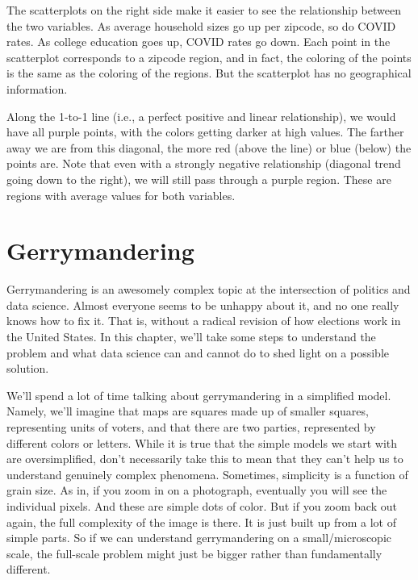 \documentclass[
  openany]{book}
\begin{document}
The scatterplots on the right side make it easier to see the relationship between the two variables. As average household sizes go up per zipcode, so do COVID rates. As college education goes up, COVID rates go down. Each point in the scatterplot corresponds to a zipcode region, and in fact, the coloring of the points is the same as the coloring of the regions. But the scatterplot has no geographical information.

Along the 1-to-1 line (i.e., a perfect positive and linear relationship), we would have all purple points, with the colors getting darker at high values. The farther away we are from this diagonal, the more red (above the line) or blue (below) the points are. Note that even with a strongly negative relationship (diagonal trend going down to the right), we will still pass through a purple region. These are regions with average values for both variables.

\hypertarget{gerrymandering}{%
\chapter{Gerrymandering}\label{gerrymandering}}

Gerrymandering is an awesomely complex topic at the intersection of politics and data science. Almost everyone seems to be unhappy about it, and no one really knows how to fix it. That is, without a radical revision of how elections work in the United States. In this chapter, we'll take some steps to understand the problem and what data science can and cannot do to shed light on a possible solution.

We'll spend a lot of time talking about gerrymandering in a simplified model. Namely, we'll imagine that maps are squares made up of smaller squares, representing units of voters, and that there are two parties, represented by different colors or letters. While it is true that the simple models we start with are oversimplified, don't necessarily take this to mean that they can't help us to understand genuinely complex phenomena. Sometimes, simplicity is a function of grain size. As in, if you zoom in on a photograph, eventually you will see the individual pixels. And these are simple dots of color. But if you zoom back out again, the full complexity of the image is there. It is just built up from a lot of simple parts. So if we can understand gerrymandering on a small/microscopic scale, the full-scale problem might just be bigger rather than fundamentally different.
\end{document}
